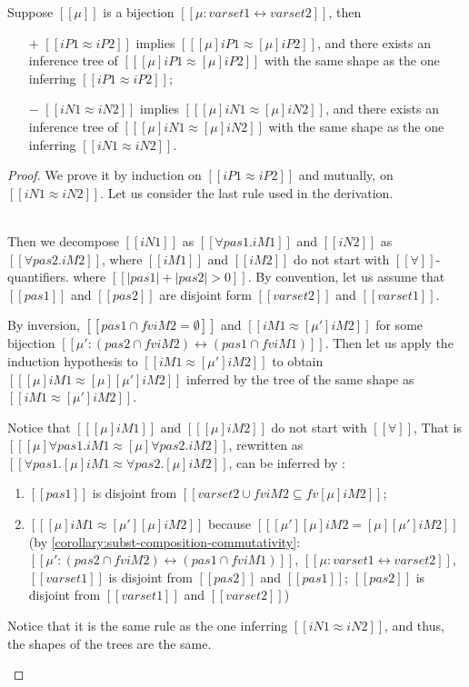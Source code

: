 \begin{lemma} 
  \label{lemma:decl-equiv-bijection}
  Suppose $[[μ]]$ is a bijection $[[μ : varset1 ↔ varset2]]$, then
  \begin{itemize}
    \item[$+$] $[[iP1 ≈ iP2]]$ implies $[[ [μ]iP1 ≈ [μ]iP2 ]]$,
      and there exists an inference tree of $[[ [μ]iP1 ≈ [μ]iP2 ]]$
      with the same shape as the one inferring $[[iP1 ≈ iP2]]$;
    \item[$-$] $[[iN1 ≈ iN2]]$ implies $[[ [μ]iN1 ≈ [μ]iN2 ]]$, 
      and there exists an inference tree of $[[ [μ]iN1 ≈ [μ]iN2 ]]$
      with the same shape as the one inferring $[[iN1 ≈ iN2]]$.
  \end{itemize}
\end{lemma}
\begin{proof}
  We prove it by induction on $[[iP1 ≈ iP2]]$ and mutually, on $[[iN1 ≈ iN2]]$.
  Let us consider the last rule used in the derivation.
  \begin{caseof}
    \item {}\\
      Then we decompose $[[iN1]]$ as $[[∀pas1.iM1]]$ and $[[iN2]]$ as $[[∀pas2.iM2]]$,
      where $[[iM1]]$ and $[[iM2]]$ do not start with $[[∀]]$-quantifiers.
      where $[[|pas1| + |pas2| > 0]]$.
      By convention, let us assume that
      $[[pas1]]$ and $[[pas2]]$ are disjoint form 
      $[[varset2]]$ and $[[varset1]]$.

      By inversion, $[[{pas1} ∩ fv iM2 = ∅]]$ and 
      $[[iM1 ≈ [μ'] iM2]]$ for some bijection
      $[[μ' : ({pas2} ∩ fv iM2) ↔ ({pas1} ∩ fv iM1)]]$.
      Then let us apply the induction hypothesis to
       $[[iM1 ≈ [μ'] iM2]]$ to obtain $[[ [μ]iM1 ≈ [μ] [μ'] iM2 ]]$ 
      inferred by the tree of the same shape as 
      $[[ iM1 ≈ [μ'] iM2 ]]$.

      Notice that $[[ [μ]iM1 ]]$ and $[[ [μ]iM2 ]]$ 
      do not start with $[[∀]]$, 
      That is $[[ [μ]∀pas1.iM1 ≈ [μ]∀pas2.iM2]]$, 
      rewritten as $[[ ∀pas1.[μ]iM1 ≈ ∀pas2.[μ]iM2]]$,
      can be inferred by :
      \begin{enumerate}
        \item $[[{pas1}]]$ is disjoint from 
        $[[varset2 ∪ fv iM2 ⊆ fv [μ]iM2 ]]$;
        \item $[[ [μ]iM1 ≈ [μ'] [μ] iM2 ]]$
          because $[[ [μ'] [μ] iM2 = [μ] [μ'] iM2 ]]$
          (by \cref{corollary:subst-composition-commutativity}:
          $[[μ' : ({pas2} ∩ fv iM2) ↔ ({pas1} ∩ fv iM1)]]$, 
          $[[μ : varset1 ↔ varset2]]$,
          $[[varset1]]$ is disjoint from 
          $[[pas2]]$ and $[[pas1]]$; 
          $[[pas2]]$ is disjoint from $[[varset1]]$ and $[[varset2]]$)
      \end{enumerate}
      Notice that it is the same rule as the one inferring 
      $[[iN1 ≈ iN2]]$, and thus, the shapes of the trees are the same.


\end{caseof}
\end{proof}
